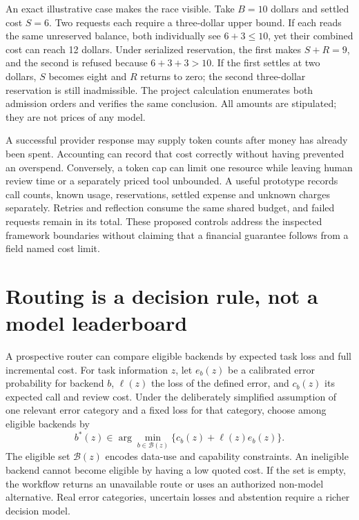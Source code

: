 An exact illustrative case makes the race visible. Take $B=10$ dollars and
settled cost $S=6$. Two requests each require a three-dollar upper bound.
If each reads the same unreserved balance, both individually see
$6+3\le10$, yet their combined cost can reach 12 dollars. Under serialized
reservation, the first makes $S+R=9$, and the second is refused because
$6+3+3>10$. If the first settles at two dollars, $S$ becomes eight and $R$
returns to zero; the second three-dollar reservation is still inadmissible.
The project calculation enumerates both admission orders and verifies the
same conclusion. All amounts are stipulated; they are not prices of any
model.\cite{exec14_l6_exact}

A successful provider response may supply token counts after money has
already been spent. Accounting can record that cost correctly without
having prevented an overspend. Conversely, a token cap can limit one
resource while leaving human review time or a separately priced tool
unbounded. A useful prototype records call counts, known usage, reservations,
settled expense and unknown charges separately. Retries and reflection
consume the same shared budget, and failed requests remain in its total.
These proposed controls address the inspected framework boundaries without
claiming that a financial guarantee follows from a field named cost limit.

\section{Routing is a decision rule, not a model leaderboard}

A prospective router can compare eligible backends by expected task loss
and full incremental cost. For task information $z$, let $e_b(z)$ be a
calibrated error probability for backend $b$, $\ell(z)$ the loss of the
defined error, and $c_b(z)$ its expected call and review cost. Under the
deliberately simplified assumption of one relevant error category and a
fixed loss for that category, choose among eligible backends by
\begin{equation}
 b^*(z)\in\arg\min_{b\in\mathcal B(z)}
       \{c_b(z)+\ell(z)e_b(z)\}.
 \label{exec14:l6-route}
\end{equation}
The eligible set $\mathcal B(z)$ encodes data-use and capability constraints.
An ineligible backend cannot become eligible by having a low quoted cost.
If the set is empty, the workflow returns an unavailable route or uses an
authorized non-model alternative. Real error categories, uncertain losses
and abstention require a richer decision model.\cite{exec14_l6_exact}

